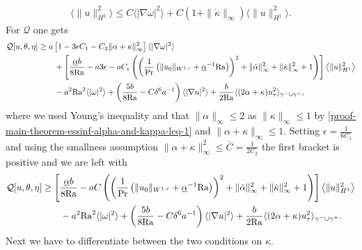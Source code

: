 \documentclass{article}
\theoremstyle{definition}
\theoremstyle{definition}
\newcommand{\Pra}{\rm{Pr}}
\newcommand{\Ra}{{\rm{Ra}}}
\begin{document}
\begin{align*}
    \langle \|u\|_{H^2}^2 \rangle \leq C \langle |\nabla \omega|^2\rangle + C (1+\|\dot\kappa\|_\infty) \langle \|u\|_{H^1}^2 \rangle.
\end{align*}
For $\mathcal{Q}$ one gets
\begin{align*}
        \mathcal{Q}[u,\theta,\eta]&\geq  a\left[1-3\epsilon C_1-C_2\|\alpha+\kappa\|_\infty^2 \right]\langle |\nabla \omega|^2\rangle 
        \\
        &\qquad + \left[\frac{\underline{\alpha} b}{8\Ra} - a 3\epsilon - a C_\epsilon\left(\left(\frac{1}{\Pra}\left(\|u_0\|_{W^{1,r}} +\underline{\alpha}^{-1}\Ra\right)\right)^2+\|\dot\alpha\|_\infty^2+\|\dot\kappa\|_\infty^2+1\right) \right]\left\langle\|u\|_{H^1}^2\right\rangle
        \\
        &\qquad - a^2 \Ra^2 \langle |\omega|^2\rangle + \left(\frac{5b}{8\Ra}-C\delta^6 a^{-1}\right) \langle |\nabla u|^2\rangle + \frac{b}{2\Ra}\langle (2\alpha+\kappa)u_\tau^2\rangle_{\gamma^-\cup\gamma^+},
\end{align*}
where we used Young's inequality and that $\|\alpha\|_\infty \leq 2$ as $\|\kappa\|_\infty \leq 1$ by \eqref{proof-main-theorem-essinf-alpha-and-kappa-leq-1} and $\|\alpha+\kappa\|_\infty \leq 1$. Setting $\epsilon = \frac{1}{6 C_1}$ and using the smallness assumption $\|\alpha+\kappa\|_\infty^2\leq \bar C= \frac{1}{2C_2}$ the first bracket is positive and we are left with
\begin{equation}
    \label{Q-estimate-before-a0}
    \begin{aligned}
        \mathcal{Q}[u,\theta,\eta] &\geq \left[\frac{\underline{\alpha} b}{8\Ra} - a C\left(\left(\frac{1}{\Pra}\left(\|u_0\|_{W^{1,r}} +\underline{\alpha}^{-1}\Ra\right)\right)^2+\|\dot\alpha\|_\infty^2+\|\dot\kappa\|_\infty^2+1\right) \right]\left\langle\|u\|_{H^1}^2\right\rangle
        \\
        &\qquad - a^2 \Ra^2 \langle |\omega|^2\rangle + \left(\frac{5b}{8\Ra}-C\delta^6 a^{-1}\right) \langle |\nabla u|^2\rangle + \frac{b}{2\Ra}\langle (2\alpha+\kappa)u_\tau^2\rangle_{\gamma^-\cup\gamma^+}.        
    \end{aligned}
\end{equation}
Next we have to differentiate between the two conditions on $\kappa$.
\end{document}
